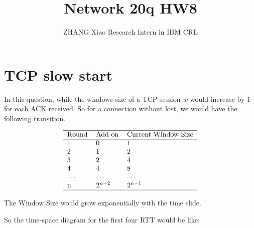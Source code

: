 \documentclass[12pt,a4paper]{article}
\author{ZHANG Xiao Research Intern in IBM CRL}
\title{Network 20q HW8}
\begin{document}
\maketitle
\pagebreak

\section{TCP slow start}
In this question, while the windows size of a TCP session $w$ would increase by 1 for each ACK received. So for a connection without lost, we would have the following transition.


\begin{equation}
\begin{tabular}{ l l l l }
\hline
Round & Add-on & Current Window Size \\
\hline
 1 & 0 & 1 \\
 2 & 1 & 2 \\
 3 & 2 & 4 \\
 4 & 4 & 8 \\
 $\cdots$ &  $\cdots$ &  $\cdots$ \\
 n  & $2^{n-2}$ &  $2^{n-1}$ \\
\hline
\end{tabular}
\end{equation}

The Window Size would grow exponentially with the time slide.

So the time-space diagram for the first four RTT would be like:
\end{document}
